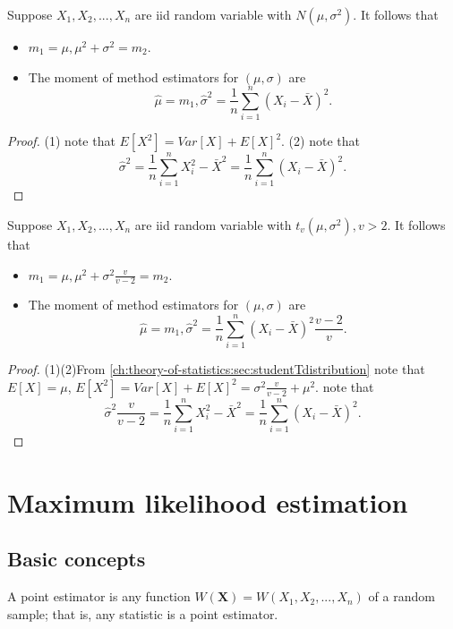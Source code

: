 \begin{refsection}
\begin{lemma}\cite[312]{casella2002statistical}
	Suppose $X_1,X_2,...,X_n$ are iid random variable with $N(\mu, \sigma^2)$. It follows that
	\begin{itemize}
		\item $m_1 = \mu, \mu^2 + \sigma^2 = m_2$.
		\item The moment of method estimators for $(\mu, \sigma)$ are
		$$\hat{\mu} = m_1, \hat{\sigma}^2 = \frac{1}{n}\sum_{i=1}^n (X_i - \bar{X})^2.$$
	\end{itemize}	
\end{lemma}
\begin{proof}
	(1) note that $E[X^2] = Var[X] + E[X]^2$.
	(2) note that 
	$$\hat{\sigma}^2 = \frac{1}{n}\sum_{i=1}^n X_i^2 - \bar{X}^2 = \frac{1}{n}\sum_{i=1}^n (X_i - \bar{X})^2.$$
\end{proof}



\begin{lemma}\label{ch:theory-of-statistics:th:methodOfMomentsStudentTEstimation}
	Suppose $X_1,X_2,...,X_n$ are iid random variable with $t_v(\mu, \sigma^2),v > 2$. It follows that
	\begin{itemize}
		\item $m_1 = \mu, \mu^2 + \sigma^2\frac{v}{v-2} = m_2$.
		\item The moment of method estimators for $(\mu, \sigma)$ are
		$$\hat{\mu} = m_1, \hat{\sigma}^2 = \frac{1}{n}\sum_{i=1}^n (X_i - \bar{X})^2 \frac{v-2}{v}.$$
	\end{itemize}		
	
\end{lemma}
\begin{proof}
	(1)(2)From \autoref{ch:theory-of-statistics:sec:studentTdistribution} note that $E[X] = \mu$, $E[X^2] = Var[X] + E[X]^2 = \sigma^2\frac{v}{v-2} + \mu^2$.
	note that 
	$$\hat{\sigma}^2\frac{v}{v-2} = \frac{1}{n}\sum_{i=1}^n X_i^2 - \bar{X}^2 = \frac{1}{n}\sum_{i=1}^n (X_i - \bar{X})^2.$$
\end{proof}




\section{Maximum likelihood estimation}
\subsection{Basic concepts}
\begin{definition}[estimator]\cite[315]{casella2002statistical}
	A point estimator is any function $W(\bm{X})=W(X_1,X_2,...,X_n)$ of a random sample; that is, any statistic is a point estimator.
\end{definition}


\end{refsection}
